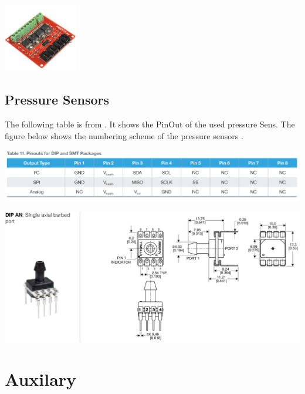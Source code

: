 \documentclass[
	fontsize=10pt
	paper=a4
]{scrartcl}
\begin{document}
\includegraphics[height=3cm]{Images/Excel/mosfet.PNG}



\subsection{Pressure Sensors}

The following table is from \cite[p. 30]{SSC_DATASHEET}. 
It shows the PinOut of the used pressure Sens.
The figure below shows the numbering scheme of the pressure sensors \cite[p. 19]{SSC_DATASHEET}.

\includegraphics[width=.9\textwidth]{Images/PressureSensor/PinOut.PNG}

\includegraphics[width=.9\textwidth]{Images/PressureSensor/PinNumbering.PNG}







\clearpage
\section{Auxilary}
\end{document}
